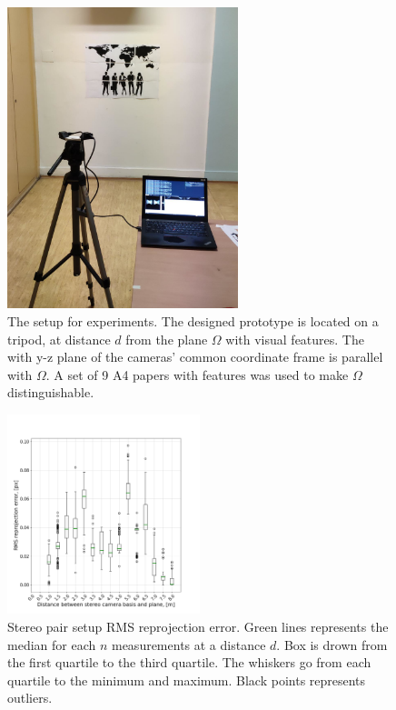 \begin{figure}[ht]
    \centering
    \includegraphics[width=0.6\textwidth]{graphics/experiment_setup.png}
    \caption[The setup for experiments]{The setup for experiments. 
    The designed prototype is located on a tripod, at distance $d$ from the plane $\Omega$ with visual features.
    The with y-z plane of the cameras' common coordinate frame is parallel with $\Omega$. 
    A set of 9 A4 papers with features was used to make $\Omega$ distinguishable.}
    \label{fig:exp_process}
\end{figure}

\begin{figure}[ht]
  \centering
  \includegraphics[width=0.5\textwidth]{graphics/experiment_1_repro_error.png}
  \caption[Stereo pair setup RMS reprojection error.]{Stereo pair setup RMS reprojection error. 
  Green lines represents the median for each $n$ measurements at a distance $d$. 
  Box is drown from the first quartile to the third quartile.
  The whiskers go from each quartile to the minimum and maximum.
  Black points represents outliers.
  }
  \label{fig:exp_1_repro}
\end{figure}

